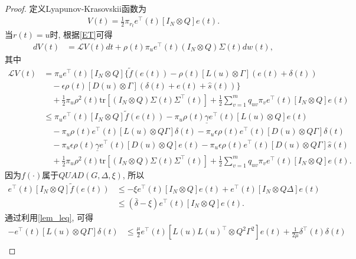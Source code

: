         \begin{proof}
        定义Lyapunov-Krasovskii函数为
        \begin{align*}
        V(t)=\frac{1}{2}\pi_{r_t}e^\top(t)[I_N\otimes Q]e(t).
        \end{align*}
        当$r(t)=u$时, 根据\autoref{ET}可得
        \begin{align}\label{dVt}
        dV(t)&=\mathcal{L}V(t)dt+\rho(t)\pi_ue^\top(t)(I_N\otimes Q)\Sigma(t)dw(t),
        \end{align}
        其中
        \begin{align}\label{LV}
        \nonumber\mathcal{L}V(t)&=\pi_ue^\top(t)[I_N\otimes Q]\Big\{\tilde{f}(e(t))-\rho(t)\left[L(u)\otimes\Gamma\right](e(t)+\delta(t))\\
        \nonumber &\quad-\epsilon\rho(t)[D(u)\otimes\Gamma](\delta(t)+e(t)+\hat{s}(t))\Big\}\\
        \nonumber &\quad+\frac{1}{2}\pi_u\rho^2(t)\text{tr}[(I_N\otimes Q)\Sigma(t)\Sigma^\top(t)]+\frac{1}{2}\sum_{v=1}^{m}q_{uv}\pi_ve^\top(t)[I_N\otimes Q]e(t)\\
        \nonumber&\leq\pi_ue^\top(t)[I_N\otimes Q]\tilde{f}(e(t))-\pi_u\rho(t)\underline{\gamma}e^\top(t)[L(u)\otimes Q]e(t)\\
        \nonumber&\quad-\pi_u\rho(t)e^\top(t)[L(u)\otimes Q\Gamma]\delta(t)-\pi_u\epsilon\rho(t)e^\top(t)[D(u)\otimes Q\Gamma]\delta(t)\\
        \nonumber &\quad-\pi_u\epsilon\rho(t)\underline{\gamma}e^\top(t)[D(u)\otimes Q]e(t)-\pi_u\epsilon\rho(t)e^\top(t)[D(u)\otimes Q\Gamma]\hat{s}(t)\\
        &\quad+\frac{1}{2}\pi_u\rho^2(t)\text{tr}[(I_N\otimes Q)\Sigma(t)\Sigma^\top(t)]+\frac{1}{2}\sum_{v=1}^{m}q_{uv}\pi_ve^\top(t)[I_N\otimes Q]e(t).
        \end{align}
        因为$f(\cdot)$属于$QUAD(G,\Delta,\xi)$, 所以
        \begin{align}
        \nonumber e^\top(t)[I_N\otimes Q]\tilde{f}(e(t))&\leq-\xi e^\top(t)[I_N\otimes Q]e(t)+e^\top(t)[I_N\otimes Q\Delta]e(t)\\
        &\leq(\bar{\delta}-\xi)e^\top(t)[I_N\otimes Q]e(t).
        \end{align}
        通过利用\autoref{lem_leq}, 可得
        \begin{align}
        \nonumber-e^\top(t)[L(u)\otimes Q\Gamma]\delta(t)&\leq\frac{\mu}{2}e^\top(t)[L(u)L(u)^\top\otimes Q^2\Gamma^2]e(t)+\frac{1}{2\mu}\delta^\top(t)\delta(t)\\

\end{align}
\end{proof}
